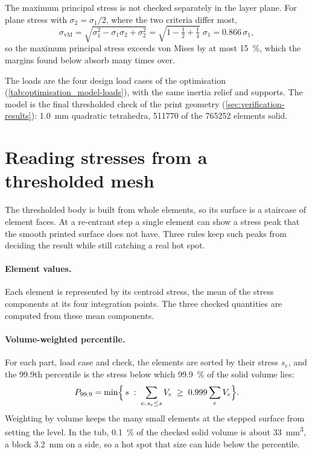 The maximum principal stress is not checked separately in the layer plane. For plane stress with $\sigma_2 = \sigma_1/2$, where the two criteria differ most,
\begin{equation}
\sigma_\text{vM} = \sqrt{\sigma_1^2 - \sigma_1\sigma_2 + \sigma_2^2} = \sqrt{1 - \tfrac{1}{2} + \tfrac{1}{4}}\;\sigma_1 = 0.866\,\sigma_1,
\end{equation}
so the maximum principal stress exceeds von Mises by at most \SI{15}{\percent}, which the margins found below absorb many times over.

The loads are the four design load cases of the optimisation (\cref{tab:optimisation_model-loads}), with the same inertia relief and supports. The model is the final thresholded check of the print geometry (\cref{sec:verification-results}): \SI{1.0}{mm} quadratic tetrahedra, \num{511770} of the \num{765252} elements solid.

\section{Reading stresses from a thresholded mesh}\label{sec:strength-evaluation}

The thresholded body is built from whole elements, so its surface is a staircase of element faces. At a re-entrant step a single element can show a stress peak that the smooth printed surface does not have. Three rules keep such peaks from deciding the result while still catching a real hot spot.

\paragraph{Element values.} Each element is represented by its centroid stress, the mean of the stress components at its four integration points. The three checked quantities are computed from these mean components.

\paragraph{Volume-weighted percentile.} For each part, load case and check, the elements are sorted by their stress $s_e$, and the 99.9th percentile is the stress below which \SI{99.9}{\percent} of the solid volume lies:
\begin{equation}
P_{99.9} = \min\Bigl\{\, s \;:\; \sum_{e:\,s_e \le s} V_e \;\ge\; 0.999 \sum_e V_e \Bigr\}.
\end{equation}
Weighting by volume keeps the many small elements at the stepped surface from setting the level. In the tub, \SI{0.1}{\percent} of the checked solid volume is about \SI{33}{mm^3}, a block \SI{3.2}{mm} on a side, so a hot spot that size can hide below the percentile.

